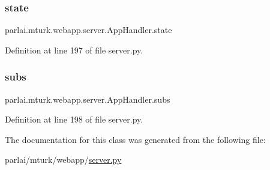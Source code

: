 \subsubsection{\texorpdfstring{state}{state}}
{\footnotesize\ttfamily parlai.\+mturk.\+webapp.\+server.\+App\+Handler.\+state}



Definition at line 197 of file server.\+py.

\mbox{\label{classparlai_1_1mturk_1_1webapp_1_1server_1_1AppHandler_a1c61eec19a28f77d438777da6e034cbc}} 
\subsubsection{\texorpdfstring{subs}{subs}}
{\footnotesize\ttfamily parlai.\+mturk.\+webapp.\+server.\+App\+Handler.\+subs}



Definition at line 198 of file server.\+py.



The documentation for this class was generated from the following file\+:\begin{DoxyCompactItemize}
\item 
parlai/mturk/webapp/\hyperlink{server_8py}{server.\+py}\end{DoxyCompactItemize}
